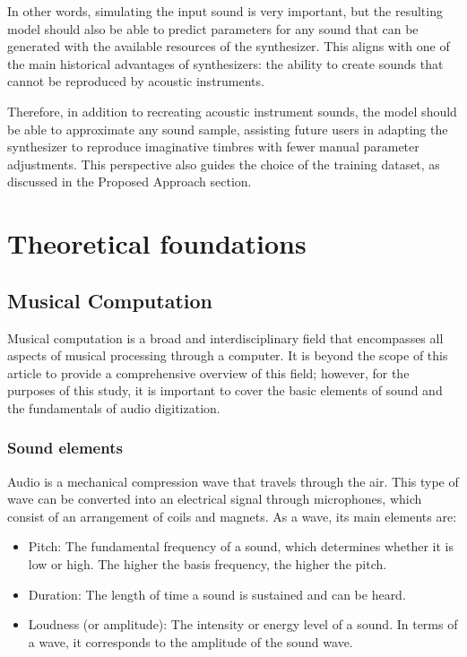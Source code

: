 \documentclass[sigconf,natbib=false]{acmart}
\begin{document}
In other words, simulating the input sound is very important, but the resulting model should also be able to predict parameters for any sound that can be generated with the available resources of the synthesizer. This aligns with one of the main historical advantages of synthesizers: the ability to create sounds that cannot be reproduced by acoustic instruments.

Therefore, in addition to recreating acoustic instrument sounds, the model should be able to approximate any sound sample, assisting future users in adapting the synthesizer to reproduce imaginative timbres with fewer manual parameter adjustments. This perspective also guides the choice of the training dataset, as discussed in the Proposed Approach section.

\section{Theoretical foundations}
\subsection{Musical Computation}

Musical computation is a broad and interdisciplinary field that encompasses all aspects of musical processing through a computer. It is beyond the scope of this article to provide a comprehensive overview of this field; however, for the purposes of this study, it is important to cover the basic elements of sound and the fundamentals of audio digitization.

\subsubsection{Sound elements}

Audio is a mechanical compression wave that travels through the air. This type of wave can be converted into an electrical signal through microphones, which consist of an arrangement of coils and magnets. As a wave, its main elements are:

\begin{itemize}
\item Pitch: The fundamental frequency of a sound, which determines whether it is low or high. The higher the basis frequency, the higher the pitch.
\item Duration: The length of time a sound is sustained and can be heard.
\item Loudness (or amplitude): The intensity or energy level of a sound. In terms of a wave, it corresponds to the amplitude of the sound wave.
\end{itemize}
\end{document}
